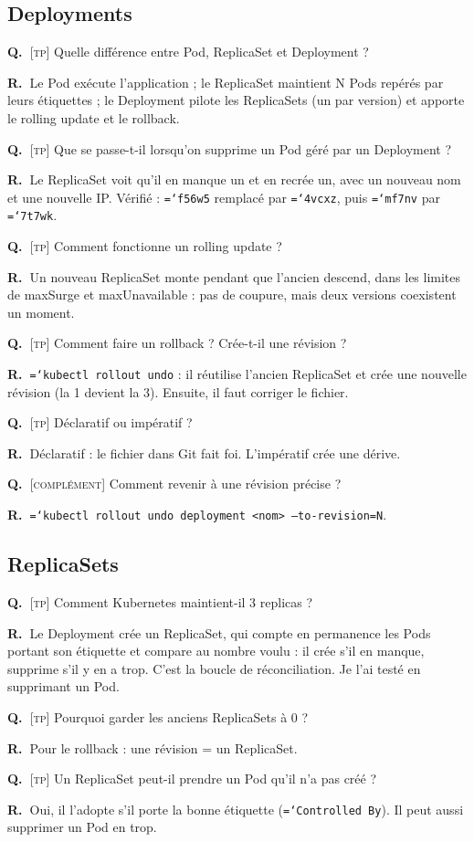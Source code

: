 \documentclass[11pt,a4paper]{article}
\newcommand{\cmd}[1]{\texttt{\hyphenchar\font=`\-#1}}
\newcommand{\tp}{\textsc{[tp]}}
\newcommand{\compl}{\textsc{[complément]}}
\newcommand{\QR}[2]{\needspace{4\baselineskip}\par\noindent\textbf{Q.~}#1\par\nopagebreak\noindent\textbf{R.~}#2\par\medskip}
\begin{document}
\subsection{Deployments}
\QR{\tp{} Quelle différence entre Pod, ReplicaSet et Deployment ?}{Le Pod exécute l'application ; le ReplicaSet maintient N Pods repérés par leurs étiquettes ; le Deployment pilote les ReplicaSets (un par version) et apporte le rolling update et le rollback.}
\QR{\tp{} Que se passe-t-il lorsqu'on supprime un Pod géré par un Deployment ?}{Le ReplicaSet voit qu'il en manque un et en recrée un, avec un nouveau nom et une nouvelle IP. Vérifié : \cmd{f56w5} remplacé par \cmd{4vcxz}, puis \cmd{mf7nv} par \cmd{7t7wk}.}
\QR{\tp{} Comment fonctionne un rolling update ?}{Un nouveau ReplicaSet monte pendant que l'ancien descend, dans les limites de maxSurge et maxUnavailable : pas de coupure, mais deux versions coexistent un moment.}
\QR{\tp{} Comment faire un rollback ? Crée-t-il une révision ?}{\cmd{kubectl rollout undo} : il réutilise l'ancien ReplicaSet et crée une nouvelle révision (la 1 devient la 3). Ensuite, il faut corriger le fichier.}
\QR{\tp{} Déclaratif ou impératif ?}{Déclaratif : le fichier dans Git fait foi. L'impératif crée une dérive.}
\QR{\compl{} Comment revenir à une révision précise ?}{\cmd{kubectl rollout undo deployment <nom> --to-revision=N}.}

\subsection{ReplicaSets}
\QR{\tp{} Comment Kubernetes maintient-il 3 replicas ?}{Le Deployment crée un ReplicaSet, qui compte en permanence les Pods portant son étiquette et compare au nombre voulu : il crée s'il en manque, supprime s'il y en a trop. C'est la boucle de réconciliation. Je l'ai testé en supprimant un Pod.}
\QR{\tp{} Pourquoi garder les anciens ReplicaSets à 0 ?}{Pour le rollback : une révision = un ReplicaSet.}
\QR{\tp{} Un ReplicaSet peut-il prendre un Pod qu'il n'a pas créé ?}{Oui, il l'adopte s'il porte la bonne étiquette (\cmd{Controlled By}). Il peut aussi supprimer un Pod en trop.}
\end{document}
